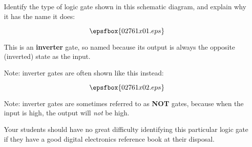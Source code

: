 

Identify the type of logic gate shown in this schematic diagram, and explain why it has the name it does:

$$\epsfbox{02761x01.eps}$$







This is an {\bf inverter} gate, so named because its output is always the opposite (inverted) state as the input.

\vskip 10pt

Note: inverter gates are often shown like this instead:

$$\epsfbox{02761x02.eps}$$

\vskip 10pt

Note: inverter gates are sometimes referred to as {\bf NOT} gates, because when the input is high, the output will {\it not} be high.







Your students should have no great difficulty identifying this particular logic gate if they have a good digital electronics reference book at their disposal.




